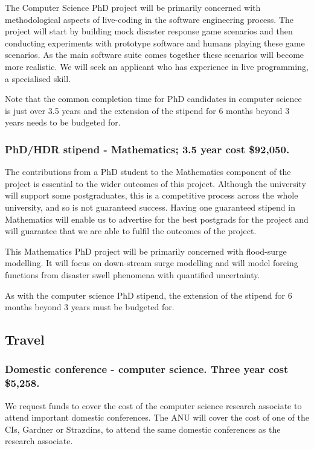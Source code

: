 \documentclass[a4paper,twoside,12pt,compact]{article}
\begin{document}
The Computer Science PhD project will be primarily concerned with methodological aspects of live-coding in the software engineering process. The project will start by building mock disaster response game scenarios and then conducting experiments with prototype software and humans playing these game scenarios. As the main software suite comes together these scenarios will become more realistic. We will seek an applicant who has experience in live programming, a specialised skill. 

Note that the common completion time for PhD candidates in computer science is just over 3.5 years and the extension of the stipend for 6 months beyond 3 years needs to be budgeted for.  

\subsubsection*{PhD/HDR stipend - Mathematics; 3.5 year cost \$92,050.}

The contributions from a PhD student to the Mathematics component of the project is essential to the wider outcomes of this project.
Although the university will support some postgraduates, this is a competitive
process across the whole university, and so is not guaranteed success. Having one guaranteed stipend in Mathematics will enable us to advertise for the best postgrads for the project and will guarantee that we are able to fulfil the outcomes of the project. 

This Mathematics PhD project will be primarily concerned with flood-surge modelling. It will focus on down-stream surge modelling and will model forcing functions from disaster swell phenomena with quantified uncertainty. 

As with the computer science PhD stipend, the extension of the stipend for 6 months beyond 3 years must be budgeted for.

\subsection*{Travel}

\subsubsection*{Domestic conference - computer science. Three year cost \$5,258.}

We request funds to cover the cost of the computer science research associate to attend important domestic conferences.  The ANU will cover the cost of one of the CIs, Gardner or Strazdins, to attend the same domestic conferences as the research associate. 
\end{document}
